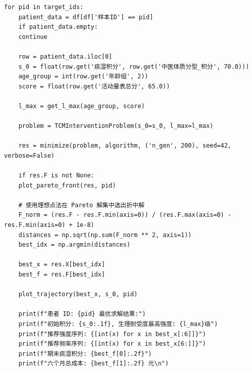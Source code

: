 \documentclass[12pt]{article}
\begin{document}
\begin{lstlisting}[caption={NSGA-Ⅱ多目标优化痰湿体质干预方案}, label={code:nsga2_tcm_intervention}]
	for pid in target_ids:
	patient_data = df[df['样本ID'] == pid]
	if patient_data.empty:
	continue
	
	row = patient_data.iloc[0]
	s_0 = float(row.get('痰湿积分', row.get('中医体质分型_积分', 70.0)))
	age_group = int(row.get('年龄组', 2))
	score = float(row.get('活动量表总分', 65.0))
	
	l_max = get_l_max(age_group, score)
	
	problem = TCMInterventionProblem(s_0=s_0, l_max=l_max)
	
	res = minimize(problem, algorithm, ('n_gen', 200), seed=42, verbose=False)
	
	if res.F is not None:
	plot_pareto_front(res, pid)
	
	# 使用理想点法在 Pareto 解集中选出折中解
	F_norm = (res.F - res.F.min(axis=0)) / (res.F.max(axis=0) - res.F.min(axis=0) + 1e-8)
	distances = np.sqrt(np.sum(F_norm ** 2, axis=1))
	best_idx = np.argmin(distances)
	
	best_x = res.X[best_idx]
	best_f = res.F[best_idx]
	
	plot_trajectory(best_x, s_0, pid)
	
	print(f"患者 ID: {pid} 最优求解结果:")
	print(f"初始积分: {s_0:.1f}, 生理耐受度最高强度: {l_max}级")
	print(f"推荐强度序列: {[int(x) for x in best_x[:6]]}")
	print(f"推荐频率序列: {[int(x) for x in best_x[6:]]}")
	print(f"期末痰湿积分: {best_f[0]:.2f}")
	print(f"六个月总成本: {best_f[1]:.2f} 元\n")
\end{lstlisting}
\end{document}
